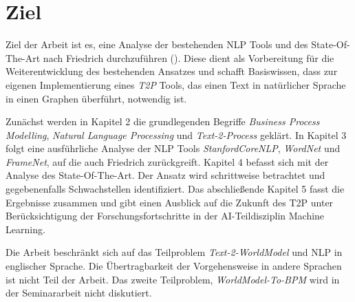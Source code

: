 \section{Ziel}

Ziel der Arbeit ist es, eine Analyse der bestehenden \ac{NLP} Tools und des State-Of-The-Art nach Friedrich durchzuführen (\cite[vgl.][]{FRIEDRICH1}). Diese dient als Vorbereitung für die Weiterentwicklung des bestehenden Ansatzes und schafft Basiswissen, dass zur eigenen Implementierung eines \textit{\ac{T2P}} Tools, das einen Text in natürlicher Sprache in einen Graphen überführt, notwendig ist.

Zunächst werden in Kapitel 2 die grundlegenden Begriffe \textit{Business Process Modelling}, \textit{Natural Language Processing} und \textit{Text-2-Process} geklärt. In Kapitel 3 folgt eine ausführliche Analyse der \ac{NLP} Tools \textit{StanfordCoreNLP}, \textit{WordNet} und \textit{FrameNet}, auf die auch Friedrich zurückgreift. Kapitel 4 befasst sich mit der Analyse des State-Of-The-Art. Der Ansatz wird schrittweise betrachtet und gegebenenfalls Schwachstellen identifiziert. Das abschließende Kapitel 5 fasst die Ergebnisse zusammen und gibt einen Ausblick auf die Zukunft des \ac{T2P} unter Berücksichtigung der Forschungsfortschritte in der \ac{AI}-Teildisziplin Machine Learning.

Die Arbeit beschränkt sich auf das Teilproblem \textit{Text-2-WorldModel} und \ac{NLP} in englischer Sprache. Die Übertragbarkeit der Vorgehensweise in andere Sprachen ist nicht Teil der Arbeit. Das zweite Teilproblem, \textit{WorldModel-To-BPM} wird in der Seminararbeit nicht diskutiert.

